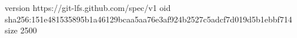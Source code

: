 version https://git-lfs.github.com/spec/v1
oid sha256:151e481535895b1a46129bcaa5aa76e3af924b2527c5adcf7d019d5b1ebbf714
size 2500
